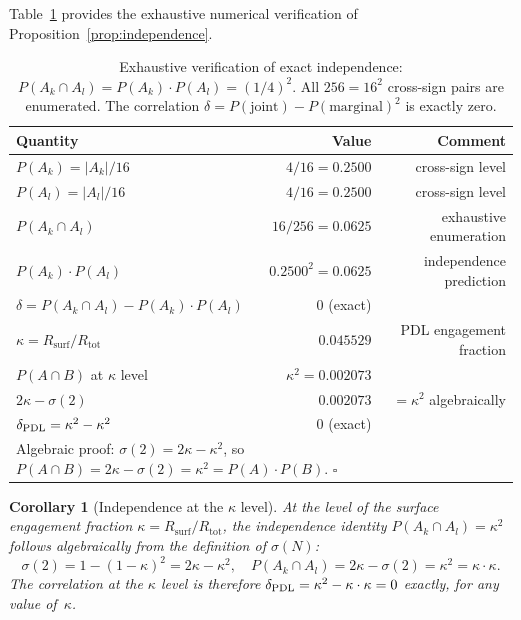 \documentclass[11pt,a4paper]{article}
\newtheorem{corollary}[theorem]{Corollary}
\theoremstyle{definition}
\newcommand{\PDL}{\textnormal{PDL}}
\newcommand{\Rsurf}{R_{\mathrm{surf}}}
\newcommand{\Rtot}{R_{\mathrm{tot}}}
\newcommand{\sig}{\sigma}
\newcommand{\kap}{\kappa}
\begin{document}
Table~\ref{tab:independence} provides the exhaustive numerical verification of Proposition~\ref{prop:independence}.

\begin{table}[ht]
\centering
\caption{Exhaustive verification of exact independence: $P(A_k\cap A_l) = P(A_k)\cdot P(A_l) = (1/4)^2$. All $256 = 16^2$ cross-sign pairs are enumerated. The correlation $\delta = P(\text{joint}) - P(\text{marginal})^2$ is exactly zero.}

\bigskip

\label{tab:independence}
\begin{tabular}{lrr}
\toprule
Quantity & Value & Comment \\
\midrule
$P(A_k) = |A_k|/16$ & $4/16 = 0.2500$ & cross-sign level \\
$P(A_l) = |A_l|/16$ & $4/16 = 0.2500$ & cross-sign level \\
$P(A_k\cap A_l)$ & $16/256 = 0.0625$ & exhaustive enumeration \\
$P(A_k)\cdot P(A_l)$ & $0.2500^2 = 0.0625$ & independence prediction \\
$\delta = P(A_k\cap A_l) - P(A_k)\cdot P(A_l)$ & $0$ (exact) & \\
\midrule
$\kap = \Rsurf/\Rtot$ & $0.045529$ & PDL engagement fraction \\
$P(A\cap B)$ at $\kap$ level & $\kap^2 = 0.002073$ & \\
$2\kap - \sig(2)$ & $0.002073$ & $= \kap^2$ algebraically \\
$\delta_{\PDL} = \kap^2 - \kap^2$ & $0$ (exact) & \\
\bottomrule
\multicolumn{3}{l}{\small Algebraic proof: $\sig(2)=2\kap-\kap^2$, so $P(A\cap B)=2\kap-\sig(2)=\kap^2=P(A)\cdot P(B)$. $\square$}
\end{tabular}
\end{table}

\begin{corollary}[Independence at the $\kap$ level]
\label{cor:kappa_independence}
At the level of the surface engagement fraction $\kap = \Rsurf/\Rtot$, the independence identity $P(A_k\cap A_l) = \kap^2$ follows algebraically from the definition of $\sig(N)$:
\begin{equation}
\sig(2) = 1-(1-\kap)^2 = 2\kap - \kap^2, \quad P(A_k\cap A_l) = 2\kap - \sig(2) = \kap^2 = \kap\cdot\kap. \label{eq:kappa_indep}
\end{equation}
The correlation at the $\kap$ level is therefore $\delta_{\PDL} = \kap^2 - \kap\cdot\kap = 0$ exactly, for any value of~$\kap$.
\end{corollary}
\end{document}
